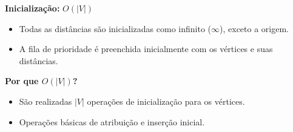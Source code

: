 \documentclass[preview]{standalone}
\begin{document}
\begin{center}
\textbf{Inicialização:} $O(|V|)$
            \begin{itemize}
                \item Todas as distâncias são inicializadas como infinito ($\infty$), exceto a origem.
                \item A fila de prioridade é preenchida inicialmente com os vértices e suas distâncias.
            \end{itemize}
            
            \textbf{Por que $O(|V|)$?}
            \begin{itemize}
                \item São realizadas $|V|$ operações de inicialização para os vértices.
                \item Operações básicas de atribuição e inserção inicial.
            \end{itemize}
\end{center}
\end{document}
